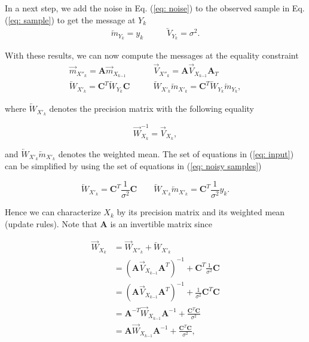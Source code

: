 \documentclass[11pt,a4paper,twoside]{report}
\newcommand{\messF}[3]{\overrightarrow{#1}_{{#2}_{k{#3}}}}
\newcommand{\messB}[3]{\overleftarrow{#1}_{{#2}_{k{#3}}}}
\newcommand{\mat}[1]{\mathbf{#1}}
\begin{document}
In a next step, we add the noise in Eq. (\ref{eq: noise}) to the observed sample in Eq. (\ref{eq: sample}) to get the message at $Y_k$
\begin{align}
	\label{eq: noisy samples}
	\messB{m}{Y}{} = y_k \qquad &\messB{V}{Y}{} =  \sigma^2.
\end{align}

With these results, we can now compute the messages at the equality constraint
\begin{align}
	\label{eq: previous state}
	\messF{m}{X''}{} = \mat{A}\messF{m}{X}{-1} \qquad &\messF{V}{X''}{} = \mat{A}\messF{V}{X}{-1}\mat{A}_T \\
	\label{eq: input}
	\messB{W}{X'}{} = \mat{C}^T\messB{W}{Y}{}\mat{C}  \qquad &\messB{W}{X'}{}\messB{m}{X'}{} = \mat{C}^T\messB{W}{Y}{}\messB{m}{Y}{},
\end{align}

where $\messB{W}{X'}{}$ denotes the precision matrix with the following equality

\begin{equation*}
	\messF{W}{X}{}^{-1} = \messF{V}{X}{},
\end{equation*}

and $\messB{W}{X'}{}\messB{m}{X'}{}$ denotes the weighted mean. The set of equations in (\ref{eq: input}) can be simplified by using the set of equations in (\ref{eq: noisy samples})

\begin{equation*}
	\messB{W}{X'}{} = \mat{C}^T\frac{1}{\sigma^2}\mat{C}  \qquad \messB{W}{X'}{}\messB{m}{X'}{} = \mat{C}^T\frac{1}{\sigma^2}y_k.
\end{equation*}


Hence we can characterize $X_k$ by its precision matrix and its weighted mean (update rules). Note that $\mat{A}$ is an invertible matrix since 

\begin{align}
  \label{eq: precision matrix}
  \messF{W}{X}{} &= \messF{W}{X''}{} + \messB{W}{X'}{} \\
  &= \left(\mat{A}\messF{V}{X}{-1}\mat{A}^T\right)^{-1} + \mat{C}^T\frac{1}{\sigma^2}\mat{C} \\
  & = \left(\mat{A}\messF{V}{X}{-1}\mat{A}^T\right)^{-1} + \frac{1}{\sigma^2}\mat{C}^T\mat{C} \\
  & = \mat{A}^{-T}\messF{W}{X}{-1}\mat{A}^{-1} + \frac{\mat{C}^T\mat{C}}{\sigma^2}  \\
  & = \mat{A}\messF{W}{X}{-1}\mat{A}^{-1} + \frac{\mat{C}^T\mat{C}}{\sigma^2},
\end{align}
\end{document}
